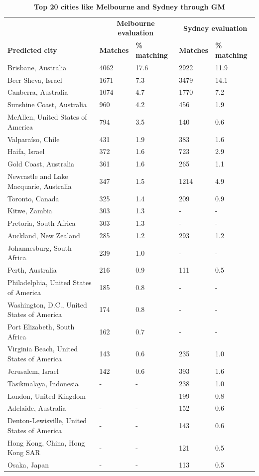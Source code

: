 \documentclass[Crown,sageh,times]{sagej}
\begin{document}
\begin{table}[!htbp]
\caption{\bf Top 20 cities like Melbourne and Sydney through GM \label{tab:melbournesydneyGM}}     
\begin{tabular}{ l l l l l}
 \hline    &  \multicolumn{2}{c}{\textbf{Melbourne evaluation}} & \multicolumn{2}{c}{\textbf{Sydney evaluation}}  \\  
\textbf{Predicted city} & \textbf{Matches} & \textbf{\% matching}  & \textbf{Matches} & \textbf{\% matching}\\ \hline

Brisbane, Australia & 4062 & 17.6 & 2922 & 11.9      \\ 
Beer Sheva, Israel & 1671 & 7.3 & 3479 & 14.1      \\ 
Canberra, Australia & 1074 & 4.7 & 1770 & 7.2      \\
Sunshine Coast, Australia & 960 & 4.2 & 456 & 1.9      \\
McAllen, United States of America & 794 & 3.5 & 140 & 0.6      \\
Valpara\'{i}so, Chile & 431 & 1.9 & 383 & 1.6      \\
Haifa, Israel & 372 & 1.6 & 723 & 2.9      \\
Gold Coast, Australia & 361 & 1.6 & 265 & 1.1      \\
Newcastle and Lake Macquarie, Australia & 347 & 1.5 & 1214 & 4.9      \\
Toronto, Canada & 325 & 1.4 & 209 & 0.9      \\
Kitwe, Zambia & 303 & 1.3 & - & -      \\
Pretoria, South Africa & 303 & 1.3 & - & -      \\
Auckland, New Zealand & 285 & 1.2 & 293 & 1.2      \\
Johannesburg, South Africa & 239 & 1.0 & - & -      \\
Perth, Australia & 216 & 0.9 & 111 & 0.5      \\
Philadelphia, United States of America & 185 & 0.8 & - & -      \\
Washington, D.C., United States of America & 174 & 0.8 & - & -      \\
Port Elizabeth, South Africa & 162 & 0.7 & - & -      \\
Virginia Beach, United States of America & 143 & 0.6 & 235 & 1.0      \\
Jerusalem, Israel & 142 & 0.6 & 393 & 1.6      \\
Tasikmalaya, Indonesia & - & - & 238 & 1.0      \\		
London, United Kingdom & - & - & 199 & 0.8      \\
Adelaide, Australia & - & - & 152 & 0.6      \\
Denton-Lewisville, United States of America & - & - & 143 & 0.6      \\						
Hong Kong, China, Hong Kong SAR & - & - & 121 & 0.5      \\		
Osaka, Japan & - & - & 113 & 0.5      \\


\end{tabular}
\end{table}
\end{document}
